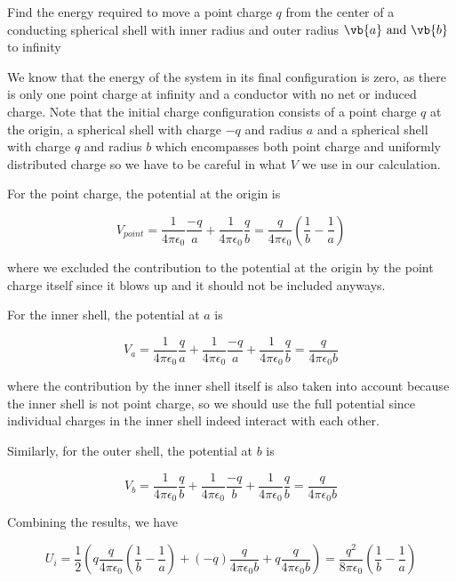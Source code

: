 \documentclass[english,a4paper,12pt]{report}
\begin{document}
{Find the energy required to move a point charge  \(q\) from the center of a conducting spherical shell with inner radius and outer radius \(\vb{a} \text { and } \vb{b} \) to infinity}
{We know that the energy of the system in its final configuration is zero, as there is only one point charge at infinity and a conductor with no net or induced charge. Note that the initial charge configuration consists of a point charge \(q\) at the origin, a spherical shell with charge \(-q\) and radius \(a\) and a spherical shell with charge \(q\) and radius \(b\) which encompasses both point charge and uniformly distributed charge so we have to be careful in what \(V\) we use in our calculation.
    
For the point charge, the potential at the origin is 

\begin{equation}
    V_{point} = \frac{1}{4\pi\epsilon_0} \frac{-q}{a} + \frac{1}{4\pi\epsilon_0} \frac{q}{b}  = \frac{q}{4\pi \epsilon_0} (\frac{1}{b} - \frac{1}{a} )
\end{equation}

where we excluded the contribution to the potential at the origin by the point charge itself since it blows up and it should not be included anyways.

For the inner shell, the potential at \(a\) is

\begin{equation}
    V_{a} = \frac{1}{4\pi\epsilon_0} \frac{q}{a} + \frac{1}{4\pi\epsilon_0} \frac{-q}{a}  + \frac{1}{4\pi\epsilon_0} \frac{q}{b} = \frac{q}{4\pi \epsilon_0 b} 
\end{equation}

where the contribution by the inner shell itself is also taken into account because the inner shell is not point charge, so we should use the full potential since individual charges in the inner shell indeed interact with each other.

Similarly, for the outer shell, the potential at \(b\) is

\begin{equation}
    V_{b} = \frac{1}{4\pi\epsilon_0} \frac{q}{b} + \frac{1}{4\pi\epsilon_0} \frac{-q}{b} + \frac{1}{4\pi\epsilon_0} \frac{q}{b}  = \frac{q}{4\pi \epsilon_0 b}   
\end{equation}

Combining the results, we have 

\begin{equation}
    U_{i} = \frac{1}{2} (q\frac{q}{4\pi \epsilon_0} (\frac{1}{b} - \frac{1}{a} ) + (-q)\frac{q}{4\pi \epsilon_0 b} + q \frac{q}{4\pi \epsilon_0 b}) = \frac{q^2}{8\pi \epsilon_0} (\frac{1}{b} - \frac{1}{a} ) 
\end{equation}

}
\end{document}
